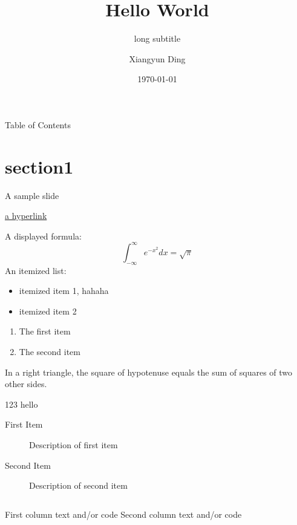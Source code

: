\documentclass[10pt]{beamer}
\title{Hello World}
\subtitle[short subtitle]{long subtitle}
\author[Xiangyun Ding]{Xiangyun Ding}
\date{\today}
\begin{document}
\frame{\titlepage}

\section[Table of Contents]{}   %
\begin{frame}{Table of Contents}
\tableofcontents
\end{frame}

\section{section1}

\begin{frame}{A sample slide}

  \href{http://v.youku.com/}{a hyperlink} 

A displayed formula:
\[
  \int_{-\infty}^\infty e^{-x^2}dx = \sqrt{\pi}
\]
An itemized list:

\begin{itemize}
  \item itemized item 1, hahaha
  \item itemized item 2
\end{itemize}
\begin{enumerate}
  \item The first item
  \item The second item
\end{enumerate}

\end{frame}

\begin{frame}

\begin{theorem}{1.1}
  In a right triangle, \small{the square of hypotenuse equals
  the sum of squares of two} other sides.
\end{theorem}

\begin{block}{123}
  hello
\end{block}

\begin{description}
  \item[First Item] Description of first item
  \vspace{0.5cm}  %
  \item[Second Item] Description of second item
\end{description}

\begin{columns}
  First column text and/or code
  Second column text and/or code
\end{columns}

\end{frame}
\end{document}
